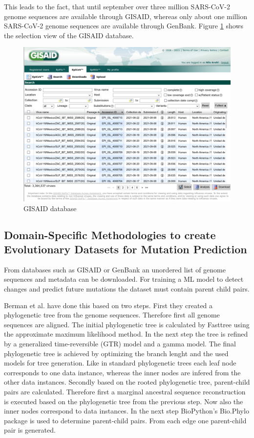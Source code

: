This leads to the fact, that until september over three million \ac{SARS-CoV-2} genome sequences are available through \ac{GISAID}, whereas only about one million \ac{SARS-CoV-2} genome sequences are available through GenBank. Figure \ref{gisaid} shows the selection view of the \ac{GISAID} database. \cite{nationallibraryofmedicinencbieditorNCBISARSCoV2Resources, gisaideditorGISAID2021}

\begin{figure}[ht]
	\centering
	\includegraphics[width=1.0\linewidth]{figures/gisaid.png}
	\caption{\ac{GISAID} database}
	\label{gisaid}
\end{figure}


\subsection{Domain-Specific Methodologies to create Evolutionary Datasets for Mutation Prediction} \label{fundamentalsC}

From databases such as \ac{GISAID} or GenBank an unordered list of genome sequences and metadata can be downloaded. For training a \ac{ML} model to detect changes and predict future mutations the dataset must contain parent child pairs.

Berman et al. \cite{Berman2020} have done this based on two steps. First they created a phylogenetic tree from the genome sequences. Therefore first all genome sequences are aligned. The initial phylogenetic tree is calculated by Fasttree using the approximate maximum likelihood method. In the next step the tree is refined by a generalized time-reversible (GTR) model and a gamma model. The final phylogenetic tree is achieved by optimizing the branch lenght and the used models for tree generation. Like in standard phylogenetic trees each leaf node corresponds to one data instance, whereas the inner nodes are infered from the other data instances.
Secondly based on the rooted phylogenetic tree, parent-child pairs are calculated. Therefore first a marginal ancestral sequence reconstruction is executed based on the phylogenetic tree from the previous step. Now also the inner nodes correspond to data instances. In the next step BioPython's \cite{10.1093/bioinformatics/btp163} Bio.Phylo package is used to determine parent-child pairs. From each edge one parent-child pair is generated. \cite{Berman2020}

